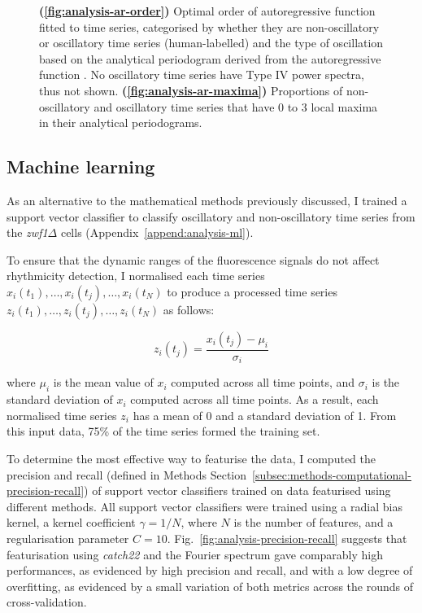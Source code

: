 \begin{figure}[hb!]
  \caption[
  ]{
    \textbf{(\ref{fig:analysis-ar-order})}
    Optimal order of autoregressive function fitted to time series, categorised by whether they are non-oscillatory or oscillatory time series (human-labelled) and the type of oscillation based on the analytical periodogram derived from the autoregressive function \parencite{jiaFrequencyDomainAnalysis2020}.
    No oscillatory time series have Type IV power spectra, thus not shown.
    \textbf{(\ref{fig:analysis-ar-maxima})}
    Proportions of non-oscillatory and oscillatory time series that have 0 to 3 local maxima in their analytical periodograms.
  }
  \label{fig:analysis-ar}
\end{figure}


\subsection{Machine learning}
\label{subsec:analysis-classification-ml}

As an alternative to the mathematical methods previously discussed, I trained a support vector classifier to classify oscillatory and non-oscillatory time series from the \textit{zwf1$\Delta$} cells (Appendix~\ref{append:analysis-ml}).

To ensure that the dynamic ranges of the fluorescence signals do not affect rhythmicity detection, I normalised each time series $x_{i}(t_{1}), \ldots , x_{i}(t_{j}), \ldots , x_{i}(t_{N})$ to produce a processed time series $z_{i}(t_{1}), \ldots , z_{i}(t_{j}), \ldots , z_{i}(t_{N})$ as follows:

\begin{equation}
  z_{i}(t_{j}) = \frac{x_{i}(t_{j}) - \mu_{i}}{\sigma_{i}}
  \label{eq:analysis-stdscore}
\end{equation}

where $\mu_{i}$ is the mean value of $x_{i}$ computed across all time points, and $\sigma_{i}$ is the standard deviation of $x_{i}$ computed across all time points.
As a result, each normalised time series $z_{i}$ has a mean of 0 and a standard deviation of 1.
From this input data, 75\% of the time series formed the training set.

To determine the most effective way to featurise the data, I computed the precision and recall (defined in Methods Section~\ref{subsec:methods-computational-precision-recall}) of support vector classifiers trained on data featurised using different methods.
All support vector classifiers were trained using a radial bias kernel, a kernel coefficient $\gamma = 1/N$, where $N$ is the number of features, and a regularisation parameter $C = 10$.
Fig.\ \ref{fig:analysis-precision-recall} suggests that featurisation using \textit{catch22} and the Fourier spectrum gave comparably high performances, as evidenced by high precision and recall, and with a low degree of overfitting, as evidenced by a small variation of both metrics across the rounds of cross-validation.

